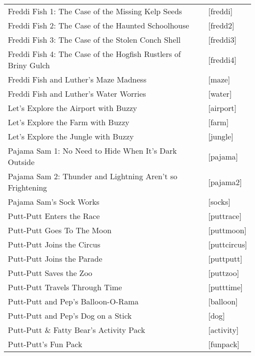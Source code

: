 \begin{itemize}
\begin{tabular}[h]{ll}
    Freddi Fish 1: The Case of the Missing Kelp Seeds&             [freddi]\\
    Freddi Fish 2: The Case of the Haunted Schoolhouse&            [fredd2]\\
    Freddi Fish 3: The Case of the Stolen Conch Shell&             [freddi3]\\
    Freddi Fish 4: The Case of the Hogfish Rustlers of Briny Gulch&[freddi4]\\
    Freddi Fish and Luther's Maze Madness&                         [maze]\\
    Freddi Fish and Luther's Water Worries&                        [water]\\
    Let's Explore the Airport with Buzzy&                          [airport]\\
    Let's Explore the Farm with Buzzy&                             [farm]\\
    Let's Explore the Jungle with Buzzy&                           [jungle]\\
    Pajama Sam 1: No Need to Hide When It's Dark Outside&          [pajama]\\
    Pajama Sam 2: Thunder and Lightning Aren't so Frightening&     [pajama2]\\
    Pajama Sam's Sock Works&                                       [socks]\\
    Putt-Putt Enters the Race&                                     [puttrace]\\
    Putt-Putt Goes To The Moon&                                    [puttmoon]\\
    Putt-Putt Joins the Circus&                                    [puttcircus]\\
    Putt-Putt Joins the Parade&                                    [puttputt]\\
    Putt-Putt Saves the Zoo&                                       [puttzoo]\\
    Putt-Putt Travels Through Time&                                [putttime]\\
    Putt-Putt and Pep's Balloon-O-Rama&                            [balloon]\\
    Putt-Putt and Pep's Dog on a Stick&                            [dog]\\
    Putt-Putt \& Fatty Bear's Activity Pack&                       [activity]\\
    Putt-Putt's Fun Pack&                                          [funpack]\\

\end{tabular}
\end{itemize}
